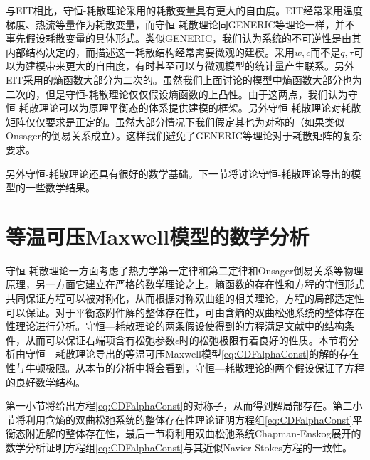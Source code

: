 与EIT相比，守恒-耗散理论采用的耗散变量具有更大的自由度。EIT经常采用温度梯度、热流等量作为耗散变量，而守恒-耗散理论同GENERIC等理论一样，并不事先假设耗散变量的具体形式。类似GENERIC，我们认为系统的不可逆性是由其内部结构决定的，而描述这一耗散结构经常需要微观的建模。采用$w,c$而不是$q,\tau$可以为建模带来更大的自由度，有时甚至可以与微观模型的统计量产生联系。另外EIT采用的熵函数大部分为二次的。虽然我们上面讨论的模型中熵函数大部分也为二次的，但是守恒-耗散理论仅仅假设熵函数的上凸性。由于这两点，我们认为守恒-耗散理论可以为原理平衡态的体系提供建模的框架。另外守恒-耗散理论对耗散矩阵仅仅要求是正定的。虽然大部分情况下我们假定其也为对称的（如果类似Onsager的倒易关系成立）。这样我们避免了GENERIC等理论对于耗散矩阵的复杂要求。

另外守恒-耗散理论还具有很好的数学基础。下一节将讨论守恒-耗散理论导出的模型的一些数学结果。

	\section{等温可压Maxwell模型的数学分析}
	守恒-耗散理论一方面考虑了热力学第一定律和第二定律和Onsager倒易关系等物理原理，另一方面它建立在严格的数学理论之上。熵函数的存在性和方程的守恒形式共同保证方程可以被对称化，从而根据对称双曲组的相关理论，方程的局部适定性可以保证\cite{kato1975cauchy,majda2012compressible}。对于平衡态附件解的整体存在性，可由含熵的双曲松弛系统的整体存在性理论进行分析\cite{yong2004entropy,kawashima2009decay}。守恒—耗散理论的两条假设使得到的方程满足文献\cite{yong1999singular}中的结构条件，从而可以保证右端项含有松弛参数$\epsilon$时的松弛极限有着良好的性质。本节将分析由守恒—耗散理论导出的等温可压Maxwell模型\eqref{eq:CDFalphaConst}的解的存在性与牛顿极限。从本节的分析中将会看到，守恒—耗散理论的两个假设保证了方程的良好数学结构。

	第一小节将给出方程\eqref{eq:CDFalphaConst}的对称子，从而得到解局部存在。第二小节将利用含熵的双曲松弛系统的整体存在性理论证明方程组\eqref{eq:CDFalphaConst}平衡态附近解的整体存在性\cite{yong2004entropy,kawashima2009decay}，最后一节将利用双曲松弛系统Chapman-Enskog展开的数学分析\cite{yong1999singular}证明方程组\eqref{eq:CDFalphaConst}与其近似Navier-Stokes方程的一致性。

